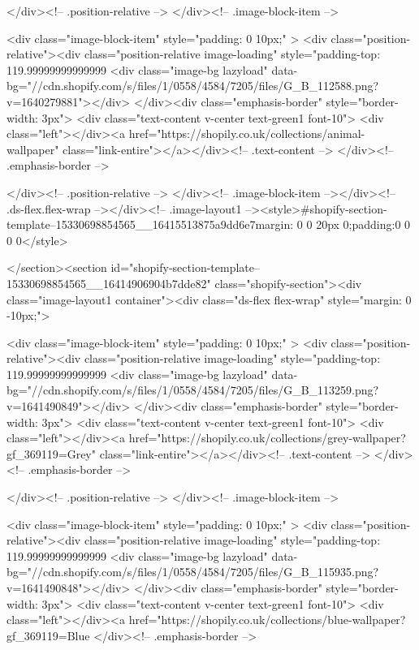 {{{{{{{          </div><!-- .position-relative -->
        </div><!-- .image-block-item -->

        <div class="image-block-item" style="padding: 0 10px;" >
          <div class="position-relative"><div class="position-relative image-loading" style="padding-top: 119.99999999999999%
                <div class="image-bg lazyload" data-bg="//cdn.shopify.com/s/files/1/0558/4584/7205/files/G_B_112588.png?v=1640279881"></div>
              </div><div class="emphasis-border" style="border-width: 3px">
              <div class="text-content v-center text-green1 font-10">
                <div class="left"></div><a href="https://shopily.co.uk/collections/animal-wallpaper" class="link-entire"></a></div><!-- .text-content -->
            </div><!-- .emphasis-border -->

          </div><!-- .position-relative -->
        </div><!-- .image-block-item --></div><!-- .ds-flex.flex-wrap --></div><!-- .image-layout1 --><style>#shopify-section-template--15330698854565__16415513875a9dd6e7{margin: 0 0 20px 0;padding:0 0 0 0}</style>

</section><section id="shopify-section-template--15330698854565__16414906904b7dde82" class="shopify-section"><div class="image-layout1 container"><div class="ds-flex flex-wrap" style="margin: 0 -10px;">

        <div class="image-block-item" style="padding: 0 10px;" >
          <div class="position-relative"><div class="position-relative image-loading" style="padding-top: 119.99999999999999%
                <div class="image-bg lazyload" data-bg="//cdn.shopify.com/s/files/1/0558/4584/7205/files/G_B_113259.png?v=1641490849"></div>
              </div><div class="emphasis-border" style="border-width: 3px">
              <div class="text-content v-center text-green1 font-10">
                <div class="left"></div><a href="https://shopily.co.uk/collections/grey-wallpaper?gf_369119=Grey" class="link-entire"></a></div><!-- .text-content -->
            </div><!-- .emphasis-border -->

          </div><!-- .position-relative -->
        </div><!-- .image-block-item -->

        <div class="image-block-item" style="padding: 0 10px;" >
          <div class="position-relative"><div class="position-relative image-loading" style="padding-top: 119.99999999999999%
                <div class="image-bg lazyload" data-bg="//cdn.shopify.com/s/files/1/0558/4584/7205/files/G_B_115935.png?v=1641490848"></div>
              </div><div class="emphasis-border" style="border-width: 3px">
              <div class="text-content v-center text-green1 font-10">
                <div class="left"></div><a href="https://shopily.co.uk/collections/blue-wallpaper?gf_369119=Blue%
            </div><!-- .emphasis-border -->

}}}}}}}
